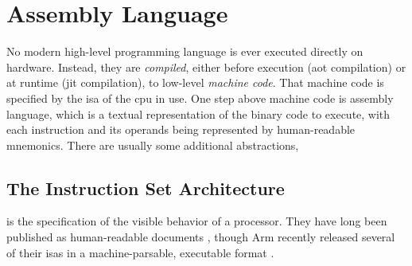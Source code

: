 

\section{Assembly Language}\label{se:assembly_language}
No modern high-level programming language is ever executed directly on hardware.
Instead, they are \emph{compiled},%
either before execution (\gls{aot} compilation) or at runtime (\gls{jit} compilation),
to low-level \emph{machine code}. That machine code is specified
by the \gls{isa} of the \gls{cpu} in use.
One step above machine code is assembly language, which is a textual representation
of the binary code to execute, with each instruction and its operands
being represented by human-readable mnemonics.
There are usually some additional abstractions,

\subsection{The  Instruction Set Architecture}
 is the specification of the visible behavior of a processor.
They have long been published as human-readable documents
\autocite{bowen1985cards,intel2019manual},
though Arm recently released several of their \glspl{isa} in a machine-parsable,
executable format \autocite{reid2016arm}.

